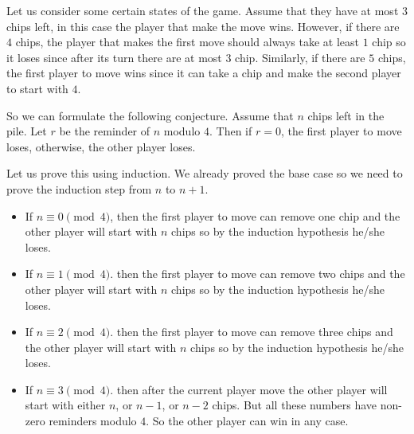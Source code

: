 Let us consider some certain states of the game.
Assume that they have at most $3$ chips left, in this case the player that make
the move wins. However, if there are $4$ chips, the
player that makes the first move should always take at least $1$ chip so it
loses since after its turn there are at most $3$ chip. Similarly, if there
are $5$ chips, the first player to move wins since it can take a chip and
make the second player to start with $4$.

So we can formulate the following conjecture.
Assume that $n$ chips left in the pile. Let $r$ be the reminder of $n$ modulo
$4$. Then if $r = 0$, the first player to move loses, otherwise, the other
player loses.

Let us prove this using induction. We already proved the base case so
we need to prove the induction step from $n$ to $n + 1$.
\begin{itemize}
  \item If $n \equiv 0 \pmod{4}$, then the first player to move can remove one
    chip and the other player will start with $n$ chips so by the induction
    hypothesis he/she loses.
  \item If $n \equiv 1 \pmod{4}$. then the first player to move can remove two
    chips and the other player will start with $n$ chips so by the induction
    hypothesis he/she loses.
  \item If $n \equiv 2 \pmod{4}$. then the first player to move can remove three
    chips and the other player will start with $n$ chips so by the induction
    hypothesis he/she loses.
  \item If $n \equiv 3 \pmod{4}$. then after the current player move the other
    player will start with either $n$, or $n - 1$, or $n - 2$ chips. But all
    these numbers have non-zero reminders modulo $4$. So the other player
    can win in any case.
\end{itemize}

